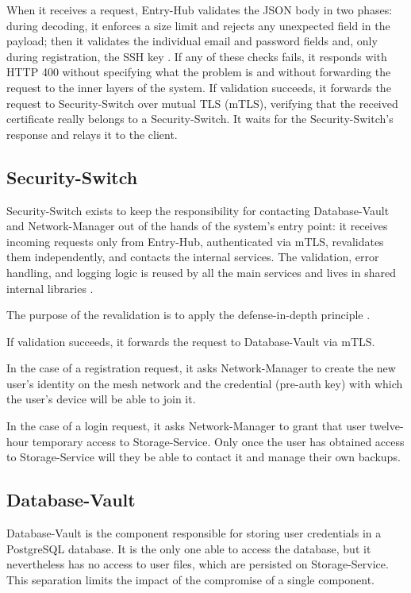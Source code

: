 When it receives a request, Entry-Hub validates the JSON body in two phases: during decoding, it enforces a
size limit and rejects any unexpected field in the payload; then it validates the individual
email and password fields and, only during registration, the SSH key \cite{ramusb-code-eh-f-04}. If any of
these checks fails, it responds with HTTP 400 without specifying what the problem is and without forwarding the
request to the inner layers of the system. If validation succeeds, it forwards the request to
Security-Switch over mutual TLS (mTLS), verifying that the received certificate really belongs to a Security-Switch.
It waits for the Security-Switch's response and relays it to the client.

\subsection{Security-Switch}

Security-Switch exists to keep the responsibility for contacting Database-Vault and Network-Manager
out of the hands of the system's entry point: it receives incoming requests only from Entry-Hub,
authenticated via mTLS, revalidates them independently, and contacts the internal services.
The validation, error handling, and logging logic is reused by all the main services
and lives in shared internal libraries \cite{ramusb-pkg}.

The purpose of the revalidation is to apply the defense-in-depth principle \cite{nist-sp-800-53r5}.

If validation succeeds, it forwards the request to Database-Vault via mTLS.

In the case of a registration request, it asks Network-Manager to create the new user's identity
on the mesh network and the credential (pre-auth key) with which the user's device will be able to join it.

In the case of a login request, it asks Network-Manager to grant that user twelve-hour temporary access
to Storage-Service. Only once the user has obtained access to Storage-Service
will they be able to contact it and manage their own backups.

\subsection{Database-Vault}
Database-Vault is the component responsible for storing user credentials in a
PostgreSQL database. It is the only one able to access the database, but it nevertheless has no access to user files,
which are persisted on Storage-Service. This separation limits the impact of the
compromise of a single component.


